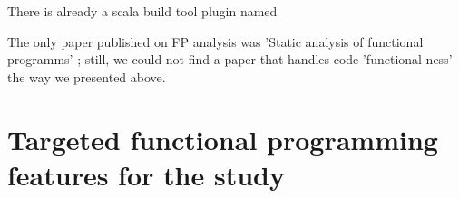 \documentclass{article}
\begin{document}
There is already a scala build tool plugin named 

The only paper published on FP analysis was  'Static analysis of functional programms'  ; still, we could not find a paper that handles code 'functional-ness' the way we presented above.\par

\section{ Targeted functional programming features for the study }




\newpage


 

\end{document}
